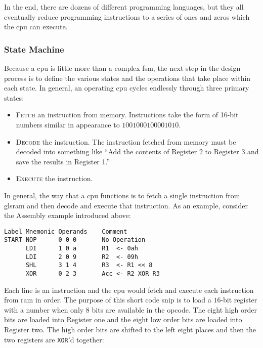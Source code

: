 In the end, there are dozens of different programming languages, but they all eventually reduce programming instructions to a series of ones and zeros which the \gls{cpu} can execute.

\subsubsection{State Machine}

Because a \gls{cpu} is little more than a complex \gls{fsm}, the next step in the design process is to define the various states and the operations that take place within each state. In general, an operating \gls{cpu} cycles endlessly through three primary states:

\begin{itemize}
  \item \textsc{Fetch} an instruction from memory. Instructions take the form of 16-bit numbers similar in appearance to $ 1001 0001 0000 1010 $.
  \item \textsc{Decode} the instruction. The instruction fetched from memory must be decoded into something like ``Add the contents of Register $ 2 $ to Register $ 3 $ and save the results in Register 1.''
  \item \textsc{Execute} the instruction.
\end{itemize}

In general, the way that a \gls{cpu} functions is to fetch a single instruction from gls{ram} and then decode and execute that instruction. As an example, consider the Assembly example introduced above:

\begin{Verbatim}[commandchars=~\[\], samepage=true, fontfamily=courier]
Label Mnemonic Operands    Comment
START NOP      0 0 0       No Operation
      LDI      1 0 a       R1  <- 0ah
      LDI      2 0 9       R2  <- 09h
      SHL      3 1 4       R3  <- R1 << 8
      XOR      0 2 3       Acc <- R2 XOR R3
\end{Verbatim}

Each line is an instruction and the \gls{cpu} would fetch and execute each instruction from \gls{ram} in order. The purpose of this short code snip is to load a $ 16 $-bit register with a number when only $ 8 $ bits are available in the opcode. The eight high order bits are loaded into Register one and the eight low order bits are loaded into Register two. The high order bits are shifted to the left eight places and then the two registers are \lstinline[columns=fixed]|XOR|'d together:

